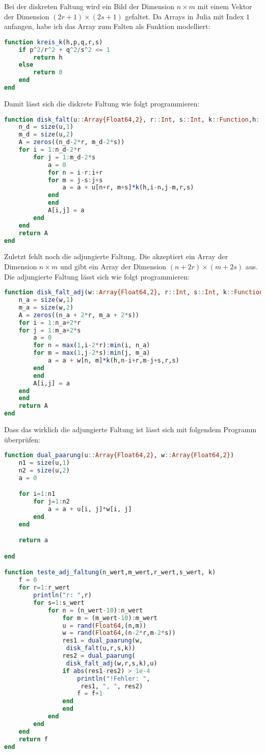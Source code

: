 \documentclass{article}
\theoremstyle{case}
\begin{document}
Bei der diskreten Faltung wird ein Bild der Dimension $n\times m$ mit einem Vektor der Dimension $(2r+1)\times (2s+1)$ gefaltet. Da Arrays in Julia mit Index $1$ anfangen, habe ich das Array zum Falten als Funktion modelliert:
\begin{lstlisting}[language=Julia]
function kreis_k(h,p,q,r,s)
	if p^2/r^2 + q^2/s^2 <= 1
		return h
	else
		return 0
	end
end
\end{lstlisting}
Damit lässt sich die diskrete Faltung wie folgt programmieren:
\begin{lstlisting}[language=Julia]
function disk_falt(u::Array{Float64,2}, r::Int, s::Int, k::Function,h::Float64)
	n_d = size(u,1)
	m_d = size(u,2)
	A = zeros((n_d-2*r, m_d-2*s))
	for i = 1:n_d-2*r
		for j = 1:m_d-2*s
			a = 0
			for n = i-r:i+r
			for m = j-s:j+s
				a = a + u[n+r, m+s]*k(h,i-n,j-m,r,s)
			end
			end
			A[i,j] = a
		end
	end
	return A
end
\end{lstlisting}
Zuletzt fehlt noch die adjungierte Faltung. Die akzeptiert ein Array der Dimension $n\times m$ und gibt ein Array der Dimension $(n+2r)\times (m+2s)$ aus. Die adjungierte Faltung lässt sich wie folgt programmieren:
\begin{lstlisting}[language=Julia]
function disk_falt_adj(w::Array{Float64,2}, r::Int, s::Int, k::Function,h::Float64)
	n_a = size(w,1)
	m_a = size(w,2)
	A = zeros((n_a + 2*r, m_a + 2*s))
	for i = 1:n_a+2*r
	for j = 1:m_a+2*s
		a = 0
		for n = max(1,i-2*r):min(i, n_a)
		for m = max(1,j-2*s):min(j, m_a)
			a = a + w[n, m]*k(h,n-i+r,m-j+s,r,s)			
		end
		end
		A[i,j] = a
	end
	end
	return A
end
\end{lstlisting}
Dass das wirklich die adjungierte Faltung ist lässt sich mit folgendem Programm überprüfen:
\begin{lstlisting}[language=Julia]
function dual_paarung(u::Array{Float64,2}, w::Array{Float64,2})
	n1 = size(u,1)
	n2 = size(u,2)
	a = 0

	for i=1:n1
		for j=1:n2
			a = a + u[i, j]*w[i, j]
		end
	end

	return a

end

function teste_adj_faltung(n_wert,m_wert,r_wert,s_wert, k)
	f = 0
	for r=1:r_wert
		println("r: ",r)
		for s=1:s_wert
			for n = (n_wert-10):n_wert
				for m = (m_wert-10):m_wert
				u = rand(Float64,(n,m))
				w = rand(Float64,(n-2*r,m-2*s))
				res1 = dual_paarung(w, 
				 disk_falt(u,r,s,k))
				res2 = dual_paarung(
				 disk_falt_adj(w,r,s,k),u)
				if abs(res1-res2) > 1e-4
					println("!Fehler: ", 
					 res1, ", ", res2)
					f = f+1
				end
				end
			end
		end
	end
	return f
end
\end{lstlisting}
\end{document}
